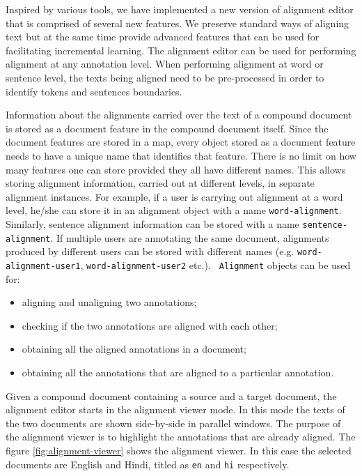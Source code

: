 
Inspired by various tools, we have implemented a new version of alignment editor
that is comprised of several new features. We preserve standard ways of aligning
text but at the same time provide advanced features that can be used for 
facilitating incremental learning. The alignment editor can be used for 
performing alignment at any annotation level. When performing alignment at word 
or sentence level, the texts being aligned need to be pre-processed in order to 
identify tokens and sentences boundaries.

Information about the alignments carried over the text of a compound document is
stored as a document feature in the compound document itself. Since the document
features are stored in a map, every object stored as a document feature needs to
have a unique name that identifies that feature. There is no limit on how many 
features one can store provided they all have different names.  This allows 
storing alignment information, carried out at different levels, in separate 
alignment instances.  For example, if a user is carrying out alignment at a word
level, he/she can store it in an alignment object with a name 
{\tt word-alignment}.  Similarly, sentence alignment information can be stored 
with a name {\tt sentence-alignment}.  If multiple users are annotating the same
document, alignments produced by different users can be stored with different 
names (e.g. {\tt word-alignment-user1}, {\tt word-alignment-user2} etc.). {\tt 
Alignment} objects can be used for:

\begin{itemize}
\item aligning and unaligning two annotations;
\item checking if the two annotations are aligned with each other;
\item obtaining all the aligned annotations in a document;
\item obtaining all the annotations that are aligned to a particular annotation.
\end{itemize}

Given a compound document containing a source and a target document, the 
alignment editor starts in the alignment viewer mode. In this mode the texts
of the two documents are shown side-by-side in parallel windows. The purpose 
of the alignment viewer is to highlight the annotations that are already aligned.
The figure \ref{fig:alignment-viewer} shows the alignment viewer.  In this case
the selected documents are English and Hindi, titled as {\tt en} and {\tt hi} 
respectively.

